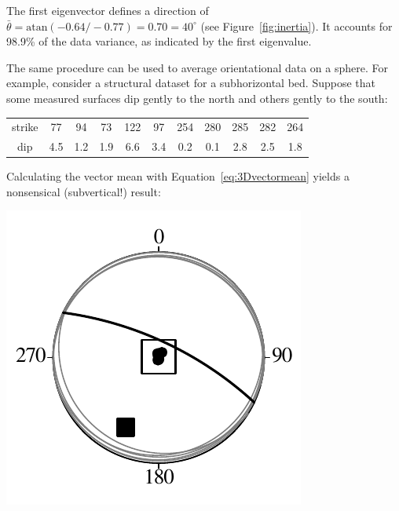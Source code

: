 The first eigenvector defines a direction of $\bar{\theta} =
\mbox{atan}(-0.64/-0.77) = 0.70 = 40^\circ$ (see
Figure~\ref{fig:inertia}). It accounts for 98.9\% of the data
variance, as indicated by the first eigenvalue.\medskip

The same procedure can be used to average orientational data on a
sphere. For example, consider a structural dataset for a subhorizontal
bed. Suppose that some measured surfaces dip gently to the north and
others gently to the south:

\begin{center}
\begin{tabular}{c|cccccccccc}
strike & 77 & 94 & 73 & 122 & 97 & 254 & 280 & 285 & 282 & 264 \\
dip & 4.5 & 1.2 & 1.9 & 6.6 & 3.4 & 0.2 & 0.1 & 2.8 & 2.5 & 1.8\\
\end{tabular}
\end{center}

Calculating the vector mean with Equation~\ref{eq:3Dvectormean} yields
a nonsensical (subvertical!) result:\medskip

\noindent\begin{minipage}[t][][b]{.35\textwidth}
\includegraphics[width=\textwidth]{../figures/subhorizontal.pdf}
\end{minipage}
\begin{minipage}[t][][t]{.65\textwidth}
  \label{fig:subhorizontal}
\end{minipage}
